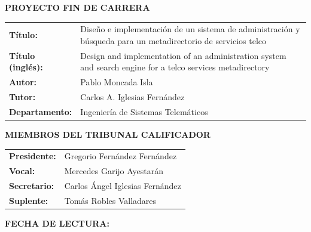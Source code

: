 \cleardoublepage
\thispagestyle{empty}
\vspace*{3\baselineskip}
{\large{\bf PROYECTO FIN DE CARRERA}}
\vspace{0.5cm}

\begin{rm}
\begin{tabular}{p{3cm}p{10cm}}
\textbf{Título:} & Diseño e implementación de un sistema de administración y búsqueda para un metadirectorio de servicios telco\\ 
\textbf{Título (inglés):} & Design and implementation of an administration system and search engine for a telco services metadirectory\\ 
\textbf{Autor:} & Pablo Moncada Isla \\ 
\textbf{Tutor:} & Carlos A. Iglesias Fernández\\ 
\textbf{Departamento:} & Ingeniería de Sistemas Telemáticos \\ 
\end{tabular} \end{rm} \vspace{1cm}

{\large{\bf MIEMBROS DEL TRIBUNAL CALIFICADOR}} \vspace{0.5cm}

\begin{rm}
\begin{tabular}{p{3cm}p{10cm}}
\textbf{Presidente:} & Gregorio Fernández Fernández\\
\textbf{Vocal:} & Mercedes Garijo Ayestarán\\
\textbf{Secretario:} & Carlos Ángel Iglesias Fernández\\
\textbf{Suplente:} & Tomás Robles Valladares
\end{tabular}
\end{rm}
\vspace{1cm}

{\large{\bf FECHA DE LECTURA:}}
\vspace{1cm}

